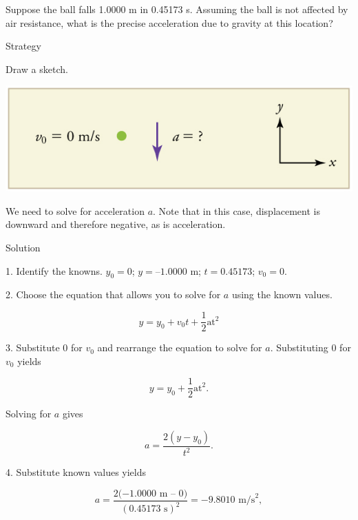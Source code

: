 \documentclass[
]{book}
\newenvironment{tinysection}{}{}
\begin{document}
Suppose the ball falls 1.0000 m in 0.45173 s. Assuming the ball is not
affected by air resistance, what is the precise acceleration due to
gravity at this location?

\begin{tinysection}

{Strategy}

\end{tinysection}

Draw a sketch.

\includegraphics{images/Figure_02_06_02b.jpg}

We need to solve for acceleration \(a{}\). Note that in this case,
displacement is downward and therefore negative, as is acceleration.

\begin{tinysection}

{Solution}

\end{tinysection}

1. Identify the knowns. \(y_{0} = 0\); \(y = –1\text{.0000\ m}\);
\({{t = 0}\text{.45173}}{}\); \({v_{0} = 0}{}\).

2. Choose the equation that allows you to solve for \(a{}\) using the
known values.

\leavevmode\hypertarget{import-auto-id3578358}{}%
\[{{y = {y_{0} + v_{0}}}{t + \frac{1}{2}}\text{at}^{2}}{}\]

3. Substitute 0 for \(v_{0}{}\) and rearrange the equation to solve for
\(a{}\). Substituting 0 for \(v_{0}{}\) yields

\leavevmode\hypertarget{import-auto-id3538274}{}%
\[{{y = {y_{0} + \frac{1}{2}}}\text{at}^{2}\text{.}}{}\]

Solving for \(a{}\) gives

\leavevmode\hypertarget{import-auto-id3504484}{}%
\[{{a = \frac{2\left( {y - y_{0}} \right)}{t^{2}}}\text{.}}{}\]

4. Substitute known values yields

\leavevmode\hypertarget{import-auto-id2571438}{}%
\[{{{a = \frac{2{( - 1}\text{.}\text{0000\ m\ –\ 0})}{(0\text{.}\text{45173\ s})^{2}}} = {- 9}}\text{.}\text{8010\ m/s}^{2},}{}\]
\end{document}
